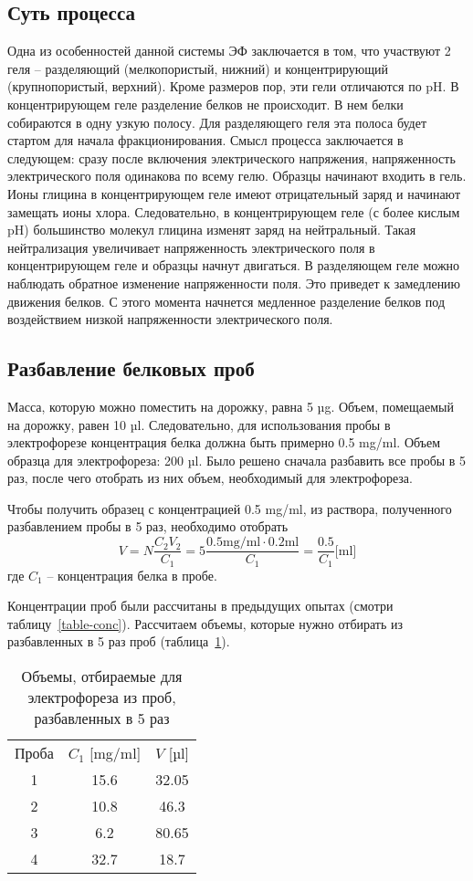 \subsection{Суть процесса}

Одна из особенностей данной системы ЭФ заключается в том, что участвуют 2 геля --
разделяющий (мелкопористый, нижний) и концентрирующий (крупнопористый, верхний). Кроме размеров
пор, эти гели отличаются по pH. В концентрирующем геле разделение белков не происходит. В нем белки
собираются в одну узкую полосу. Для разделяющего геля эта полоса будет стартом для начала
фракционирования. Смысл процесса заключается в следующем: сразу после включения электрического
напряжения, напряженность электрического поля одинакова по всему гелю. Образцы начинают входить
в гель. Ионы глицина в концентрирующем геле имеют отрицательный заряд и начинают замещать ионы
хлора. Следовательно, в концентрирующем геле (с более кислым pH) большинство молекул глицина
изменят заряд на нейтральный. Такая нейтрализация увеличивает напряженность электрического
поля в концентрирующем геле и образцы начнут двигаться. В разделяющем геле можно наблюдать обратное
изменение напряженности поля. Это приведет к замедлению движения белков.
С этого момента начнется медленное разделение белков под воздействием низкой напряженности
электрического поля.

\subsection{Разбавление белковых проб}
Масса, которую можно поместить на дорожку, равна 5 µg.
Объем, помещаемый на дорожку, равен 10 µl.
Следовательно, для использования пробы в электрофорезе концентрация
белка должна быть примерно 0.5 mg/ml.
Объем образца для электрофореза: 200 µl.
Было решено сначала разбавить все пробы в 5 раз, после чего
отобрать из них объем, необходимый для электрофореза.

Чтобы получить образец с концентрацией 0.5 mg/ml,
из раствора, полученного разбавлением пробы в 5 раз,
необходимо отобрать
$$ V = N \frac{C_2 V_2}{C_1} = 5 \frac{0.5 \text{mg/ml} \cdot 0.2 \text{ml}}{C_1} = \frac{0.5}{C_1} \text{[ml]} $$
где $C_1$ -- концентрация белка в пробе.

Концентрации проб были рассчитаны в предыдущих опытах
(смотри таблицу~\ref{table-conc}).
Рассчитаем объемы, которые нужно отбирать из разбавленных в 5 раз проб
(таблица~\ref{table-ef-v}).

\begin{table}[htbp]
\caption{Объемы, отбираемые для электрофореза из проб, разбавленных в 5 раз}
\begin{tabular}{|c|c|c|}
\hline
Проба & $C_1$ [mg/ml] & $V$ [µl] \\
1 & 15.6  & 32.05 \\
2 & 10.8  & 46.3  \\
3 & 6.2   & 80.65 \\
4 & 32.7  & 18.7  \\
\hline
\end{tabular}
\label{table-ef-v}
\end{table}

